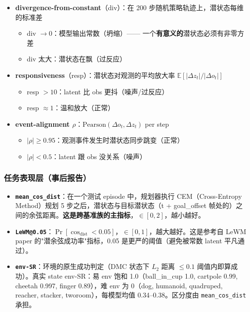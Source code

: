 \documentclass[11pt,a4paper]{article}
\begin{document}
\begin{itemize}[leftmargin=2em]
    \item \textbf{divergence-from-constant}（div）：在 200 步随机策略轨迹上，潜状态每维的标准差
    \begin{itemize}
        \item div $\to 0$：模型输出常数（坍缩）—— 一个\textbf{有意义的}潜状态必须有非零方差
        \item div 太大：潜状态在飘（过反应）
    \end{itemize}
    \item \textbf{responsiveness}（resp）：潜状态对观测的平均放大率 $\mathbb{E}[|\Delta z_t| / |\Delta o_t|]$
    \begin{itemize}
        \item resp $> 10$：latent 比 obs 更抖（噪声/过反应）
        \item resp $\approx 1$：温和放大（正常）
    \end{itemize}
    \item \textbf{event-alignment \ensuremath{\rho}}：$\text{Pearson}(\Delta o_t, \Delta z_t)$ per step
    \begin{itemize}
        \item $|\rho| \geq 0.95$：观测事件发生时潜状态同步跳变（正常）
        \item $|\rho| < 0.5$：latent 跟 obs 没关系（噪声）
    \end{itemize}
\end{itemize}

\subsubsection{任务表现层（事后报告）}

\begin{itemize}[leftmargin=2em]
    \item \textbf{\texttt{mean\_cos\_dist}}：在一个测试 episode 中，规划器执行 CEM（Cross-Entropy Method）规划 5 步之后，潜状态与目标潜状态（t + goal\_offset 帧处的）之间的余弦距离。\textbf{这是跨基准族的主指标}，$\in [0, 2]$，越小越好。
    \item \textbf{\texttt{LeWM@0.05}}：$\Pr[\cos_\text{dist} < 0.05]$，$\in [0, 1]$，越大越好。这是参考自 LeWM paper 的"潜余弦成功率"指标，0.05 是更严的阈值（避免被常数 latent 平凡通过）。
    \item \textbf{\texttt{env-SR}}：环境的原生成功判定（DMC 状态下 $L_2$ 距离 $\leq 0.1$ 阈值内即算成功）。真实 state env-SR：易 env 饱和 1.0（ball\_in\_cup 1.0, cartpole 0.99, cheetah 0.997, finger 0.89），难 env 为 0（dog, humanoid, quadruped, reacher, stacker, tworoom），每模型均值 0.34–0.38。区分度由 \texttt{mean\_cos\_dist} 承担。
\end{itemize}
\end{document}

